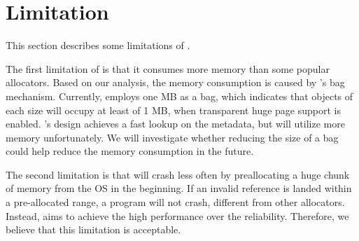 \section{Limitation}
\label{sec:limit}

This section describes some limitations of \NM{}. 

The first limitation of \NM{} is that it consumes more memory than some popular allocators. Based on our analysis, the memory consumption is caused by \NM{}'s bag mechanism. Currently, \NM{} employs one MB as a bag, which indicates that objects of each size will occupy at least of 1 MB, when transparent huge page support is enabled. \NM{}'s design achieves a fast lookup on the metadata, but will utilize more memory unfortunately. We will investigate whether reducing the size of a bag could help reduce the memory consumption in the future.

The second limitation is that \NM{} will crash less often by preallocating a huge chunk of memory from the OS in the beginning. If an invalid reference is landed within a pre-allocated range, a program will not crash, different from other allocators. Instead, \NM{} aims to achieve the high performance over the reliability. Therefore, we believe that this limitation is acceptable.  